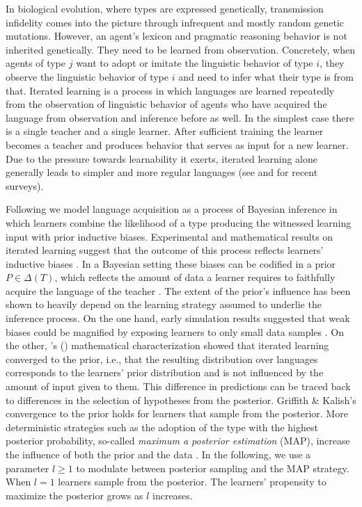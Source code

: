 \documentclass[a4paper]{article}
\newcommand{\citeposs}[2][]{\citeauthor{#2}'s (\citeyear[#1]{#2})}
\begin{document}
In biological evolution, where types are expressed genetically, transmission infidelity comes
into the picture through infrequent and mostly random genetic mutations. However, an agent's lexicon
and pragmatic reasoning behavior is not inherited genetically. They need to be learned from
observation. Concretely, when agents of type $j$ want to adopt or imitate the linguistic
behavior of type $i$, they observe the linguistic behavior of type $i$ and need to infer what
their type is from that. Iterated learning is a process in which languages are learned repeatedly from the observation
of linguistic behavior of agents who have acquired the language from observation and inference
before as well. In the simplest case there is a single teacher and a single
learner. After sufficient training the learner becomes a teacher and produces behavior that
serves as input for a new learner. Due to the pressure towards learnability it exerts, iterated
learning alone generally leads to simpler and more regular languages (see \citealt{kirby+etal:2014}
and \citealt{tamariz+kirby:2016} for recent surveys). 

Following \citet{griffiths+kalish:2007} we model language acquisition as a process of Bayesian
inference in which learners combine the likelihood of a type producing the witnessed learning
input with prior inductive biases. Experimental and mathematical results on iterated learning
suggest that the outcome of this process reflects learners' inductive biases
\citep[e.g.,][]{kirby+etal:2014}. In a Bayesian setting these biases can be codified in a prior
$P \in \Delta(T)$, which reflects the amount of data a learner requires to faithfully acquire
the language of the teacher \citep[cf.][450]{griffiths+kalish:2007}. The extent of the prior's
influence has been shown to heavily depend on the learning strategy assumed to underlie the
inference process. On the one hand, early simulation results suggested that weak biases could
be magnified by exposing learners to only small data samples \citep[e.g. in][]{brighton:2002}. On the other, \citeposs{griffiths+kalish:2007} mathematical
characterization showed that iterated learning converged to the prior, i.e., that the resulting
distribution over languages corresponds to the learners' prior distribution and is not
influenced by the amount of input given to them. This difference in predictions can be traced
back to differences in the selection of hypotheses from the posterior. Griffith \& Kalish's
convergence to the prior holds for learners that sample from the posterior. More deterministic
strategies such as the adoption of the type with the highest posterior probability, so-called
{\it maximum a posterior estimation} (MAP), increase the influence of both the prior and the
data \citep{griffiths+kalish:2007,kirby+etal:2007}. In the following, we use a parameter
$l\ge1$ to modulate between posterior sampling and the MAP strategy. When $l = 1$ learners
sample from the posterior. The learners' propensity to maximize the posterior grows as $l$
increases.
\end{document}
